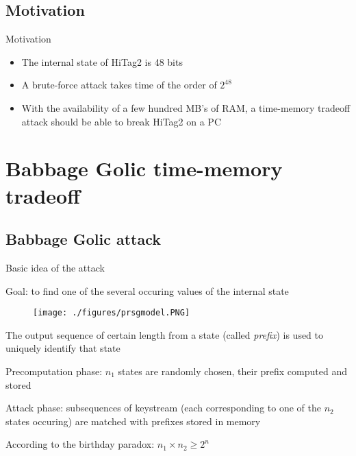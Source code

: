 \documentclass{beamer}
\begin{document}
\subsection{Motivation}
\begin{frame}{Motivation}
\begin{itemize}
	\item The internal state of HiTag2 is 48 bits
	\item A brute-force attack takes time of the order of $2^{48}$
	\item With the availability of a few hundred MB's of RAM, a time-memory tradeoff attack should be able to break HiTag2 on a PC
\end{itemize}
\end{frame}

\section{Babbage Golic time-memory tradeoff}

\subsection{Babbage Golic attack}

\begin{frame}{Basic idea of the attack}
\begin{itemize}
\small{
	\item Goal: to find one of the several occuring values of the internal state
}
\end{itemize}
	
	\begin{figure}[htp]
	\centering
	\texttt{[image: ./figures/prsgmodel.PNG]}
	\end{figure}

\begin{itemize}	
\small{
	\item The output sequence of certain length from a state (called \textit{prefix}) is used to uniquely identify that state
	\item Precomputation phase: $n_1$ states are randomly chosen, their prefix computed and stored
	\item Attack phase: subsequences of keystream (each corresponding to one of the $n_2$ states occuring) are matched with prefixes stored in memory
	\item According to the birthday paradox: $n_1 \times n_2 \geq 2^n$
}
\end{itemize}
\end{frame}
\end{document}
